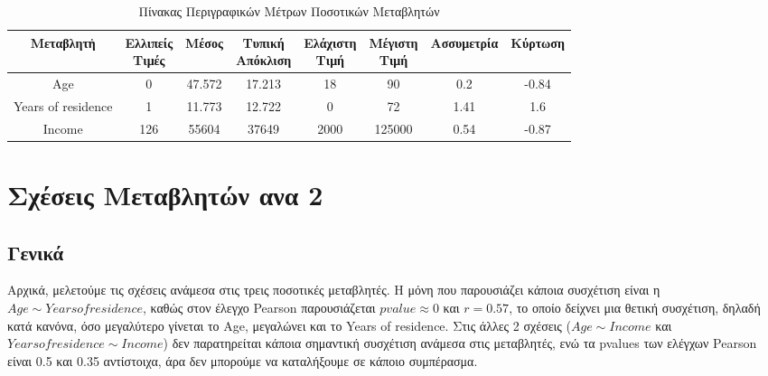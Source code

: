 \documentclass[10pt, letterpaper]{article}
\begin{document}
        \begin{table}[h!]
            \centering 
            \caption{Πίνακας Περιγραφικών Μέτρων Ποσοτικών Μεταβλητών} 
            \label{vartable} 
            \begin{tabular}{||c|c|c|c|c|c|c|c||}
                \hline
                Μεταβλητἠ & \makecell{Ελλιπείς \\ Τιμές} & Μέσος & \makecell{Τυπική \\ Απόκλιση} & \makecell{Ελάχιστη \\ Τιμή} & \makecell{Μέγιστη \\ Τιμή} & Ασσυμετρία & Κύρτωση \\
                \hline
                Age & 0 & 47.572 & 17.213 & 18 & 90 & 0.2 & -0.84 \\ 
                \hline
                Years of residence & 1 & 11.773 & 12.722 & 0 & 72 &  1.41 & 1.6 \\
                \hline
                Income & 126 & 55604 & 37649 & 2000 & 125000 & 0.54 & -0.87 \\ 
                \hline
            \end{tabular}
        \end{table} 

    \section{Σχέσεις Μεταβλητών ανα 2}

        \subsection{Γενικά}

            \par Αρχικά, μελετούμε τις σχέσεις ανάμεσα στις τρεις ποσοτικές μεταβλητές. Η μόνη που παρουσιάζει κάποια συσχέτιση είναι η $Age \sim Yearsofresidence$, καθώς στον έλεγχο Pearson παρουσιάζεται $pvalue \approx 0$ και $r=0.57$, το οποίο δείχνει μια θετική συσχέτιση, δηλαδή κατά κανόνα, όσο μεγαλύτερο γίνεται το Age, μεγαλώνει και το Years of residence. Στις άλλες 2 σχέσεις ($ Age \sim Income$ και $Years of residence \sim Income$) δεν παρατηρείται κάποια σημαντική συσχέτιση ανάμεσα στις μεταβλητές, ενώ τα pvalues των ελέγχων Pearson είναι 0.5 και 0.35 αντίστοιχα, άρα δεν μπορούμε να καταλήξουμε σε κάποιο συμπέρασμα.
            
\end{document}
